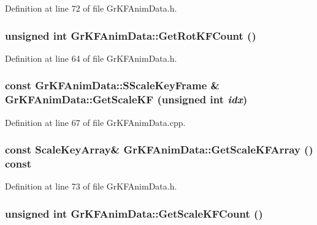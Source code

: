Definition at line 72 of file GrKFAnimData.h.\hypertarget{class_gr_k_f_anim_data_9d7773764a0a4a6816b3feec7c7ea350}{
\subsubsection[{GetRotKFCount}]{\setlength{\rightskip}{0pt plus 5cm}unsigned int GrKFAnimData::GetRotKFCount ()}}
\label{class_gr_k_f_anim_data_9d7773764a0a4a6816b3feec7c7ea350}




Definition at line 64 of file GrKFAnimData.h.\hypertarget{class_gr_k_f_anim_data_5dd218dbf01f0898af6b7abd891a743d}{
\subsubsection[{GetScaleKF}]{\setlength{\rightskip}{0pt plus 5cm}const {\bf GrKFAnimData::SScaleKeyFrame} \& GrKFAnimData::GetScaleKF (unsigned int {\em idx})}}
\label{class_gr_k_f_anim_data_5dd218dbf01f0898af6b7abd891a743d}




Definition at line 67 of file GrKFAnimData.cpp.\hypertarget{class_gr_k_f_anim_data_3e3baf34cc6fc43210abf023922249fd}{
\subsubsection[{GetScaleKFArray}]{\setlength{\rightskip}{0pt plus 5cm}const {\bf ScaleKeyArray}\& GrKFAnimData::GetScaleKFArray () const}}
\label{class_gr_k_f_anim_data_3e3baf34cc6fc43210abf023922249fd}




Definition at line 73 of file GrKFAnimData.h.\hypertarget{class_gr_k_f_anim_data_f74c053a04b17c4c8a939d74ff255e65}{
\subsubsection[{GetScaleKFCount}]{\setlength{\rightskip}{0pt plus 5cm}unsigned int GrKFAnimData::GetScaleKFCount ()}}
\label{class_gr_k_f_anim_data_f74c053a04b17c4c8a939d74ff255e65}




